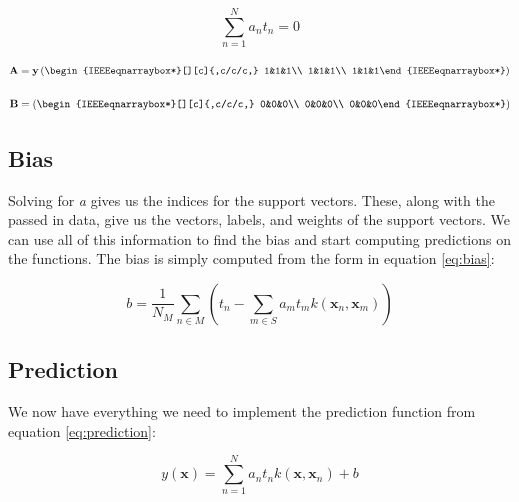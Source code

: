 \documentclass[journal]{IEEEtran}
\begin{document}
    \begin{equation}
    \label{eq:equalityConstraints}
    \sum\limits_{n = 1}^Na_n t_n = 0
    \end{equation}

    \begin{equation}
    \mathbf{A} = \mathbf{y} \left(\begin{IEEEeqnarraybox*}[][c]{,c/c/c,}
    1&1&1\\
    1&1&1\\
    1&1&1%
    \end{IEEEeqnarraybox*}\right)
    \end{equation}

    \begin{equation}
    \mathbf{B} = \left(\begin{IEEEeqnarraybox*}[][c]{,c/c/c,}
    0&0&0\\
    0&0&0\\
    0&0&0%
    \end{IEEEeqnarraybox*}\right)
    \end{equation}

    \subsection{Bias}
    Solving for \textit{a} gives us the indices for the support vectors. These, along with the passed in data, give us the vectors, labels, and weights of the support vectors. We can use all of this information to find the bias and start computing predictions on the functions. The bias is simply computed from the form in equation \ref{eq:bias}:

    \begin{equation}
    \label{eq:bias}
    b = \frac{1}{N_M} \sum\limits_{n \in M} (t_n - \sum\limits_{m \in S} a_m t_m k(\mathbf{x}_n, \mathbf{x}_m))
    \end{equation}

    \subsection{Prediction}
    We now have everything we need to implement the prediction function from equation \ref{eq:prediction}:

    \begin{equation}
    \label{eq:prediction}
    y(\mathbf{x}) = \sum\limits_{n = 1}^N a_n t_n k(\mathbf{x}, \mathbf{x}_n) + b
    \end{equation}
\end{document}
